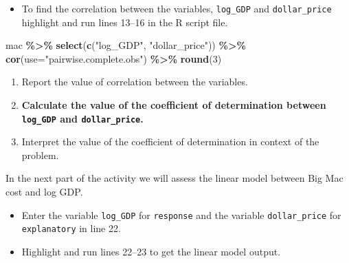 \documentclass[
]{report}
\newenvironment{Shaded}{\begin{snugshade}}{\end{snugshade}}
\newcommand{\AttributeTok}[1]{\textcolor[rgb]{0.13,0.29,0.53}{#1}}
\newcommand{\CommentTok}[1]{\textcolor[rgb]{0.56,0.35,0.01}{\textit{#1}}}
\newcommand{\DecValTok}[1]{\textcolor[rgb]{0.00,0.00,0.81}{#1}}
\newcommand{\FunctionTok}[1]{\textcolor[rgb]{0.13,0.29,0.53}{\textbf{#1}}}
\newcommand{\NormalTok}[1]{#1}
\newcommand{\OtherTok}[1]{\textcolor[rgb]{0.56,0.35,0.01}{#1}}
\newcommand{\SpecialCharTok}[1]{\textcolor[rgb]{0.81,0.36,0.00}{\textbf{#1}}}
\newcommand{\StringTok}[1]{\textcolor[rgb]{0.31,0.60,0.02}{#1}}
\providecommand{\tightlist}{%
  \setlength{\itemsep}{0pt}\setlength{\parskip}{0pt}}
\begin{document}
\begin{itemize}
\tightlist
\item
  To find the correlation between the variables, \texttt{log\_GDP} and \texttt{dollar\_price} highlight and run lines 13--16 in the R script file.
\end{itemize}

\begin{Shaded}
\begin{Highlighting}[]
\NormalTok{mac }\SpecialCharTok{\%\textgreater{}\%} 
  \FunctionTok{select}\NormalTok{(}\FunctionTok{c}\NormalTok{(}\StringTok{"log\_GDP"}\NormalTok{, }\StringTok{"dollar\_price"}\NormalTok{)) }\SpecialCharTok{\%\textgreater{}\%}
  \FunctionTok{cor}\NormalTok{(}\AttributeTok{use=}\StringTok{"pairwise.complete.obs"}\NormalTok{) }\SpecialCharTok{\%\textgreater{}\%}
  \FunctionTok{round}\NormalTok{(}\DecValTok{3}\NormalTok{)}
\end{Highlighting}
\end{Shaded}

\begin{enumerate}
\def\labelenumi{\arabic{enumi}.}
\item
  Report the value of correlation between the variables.
  \vspace{0.2in}
\item
  \textbf{Calculate the value of the coefficient of determination between \texttt{log\_GDP} and \texttt{dollar\_price}.}
  \vspace{0.4in}
\item
  Interpret the value of the coefficient of determination in context of the problem.
  \vspace{0.6in}
\end{enumerate}

In the next part of the activity we will assess the linear model between Big Mac cost and log GDP.

\begin{itemize}
\item
  Enter the variable \texttt{log\_GDP} for \texttt{response} and the variable \texttt{dollar\_price} for \texttt{explanatory} in line 22.
\item
  Highlight and run lines 22--23 to get the linear model output.
\end{itemize}

\begin{Shaded}
\end{Shaded}
\end{document}
